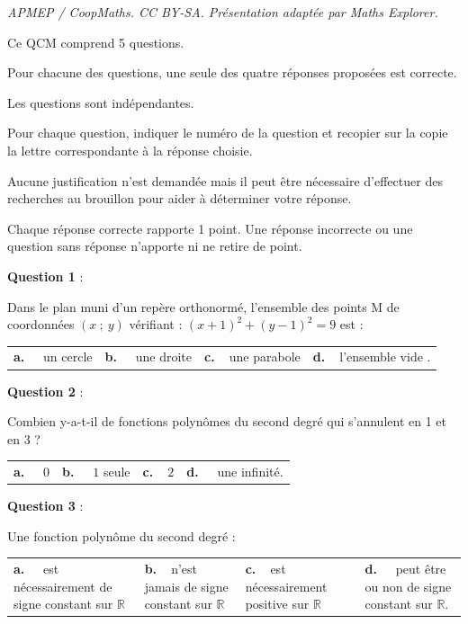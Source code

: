 \documentclass[10pt]{article}
\providecommand{\R}{\mathbb{R}}
\begin{document}
\noindent\textit{APMEP / CoopMaths. CC BY-SA. Présentation adaptée par Maths Explorer.}\par\medskip
\medskip

Ce QCM comprend 5 questions. 

Pour chacune des questions, une seule des quatre réponses proposées est correcte. 

Les questions sont indépendantes.

Pour chaque question, indiquer le numéro de la question et recopier sur la copie la lettre correspondante à la réponse choisie.

Aucune justification n'est demandée mais il peut être nécessaire d'effectuer des recherches au brouillon pour aider à déterminer votre réponse.

Chaque réponse correcte rapporte 1 point. Une réponse incorrecte ou une question sans réponse n'apporte ni ne retire de point.

\medskip
\textbf{Question 1} :
\medskip 

Dans le plan muni d'un repère orthonormé, l'ensemble des points M de coordonnées $(x~;~y)$ vérifiant : $(x + 1)^2+(y - 1)^2 = 9$ est :

\begin{center}
\begin{tabularx}{\linewidth}{*{4}{X}}
\textbf{a.~~} un cercle  &\textbf{b.~~} une droite &\textbf{c.~~}une parabole & \textbf{d.~~}l'ensemble vide .
\end{tabularx}
\end{center}

\medskip
\textbf{Question 2} :
\medskip 

Combien y-a-t-il de fonctions polynômes du second degré qui s'annulent en 1 et en 3 ?

\begin{center}
\begin{tabularx}{\linewidth}{*{4}{X}}
\textbf{a.~~} $0$ &\textbf{b.~~} $ 1 $ seule&\textbf{c.~~}$2$& \textbf{d.~~} une infinité.
\end{tabularx}
\end{center}

\medskip
\textbf{Question 3} :
\medskip 

Une fonction polynôme du second degré :

\begin{center}
\begin{tabularx}{\linewidth}{*{4}{X}}
\textbf{a.~~} est nécessairement de signe constant sur $\R$ &\textbf{b.~~}n'est jamais de signe constant sur $\R$ $ $&\textbf{c.~~}est nécessairement positive sur $\R$& \textbf{d.~~} peut être ou non de signe constant sur $\R$.
\end{tabularx}
\end{center}
\end{document}
